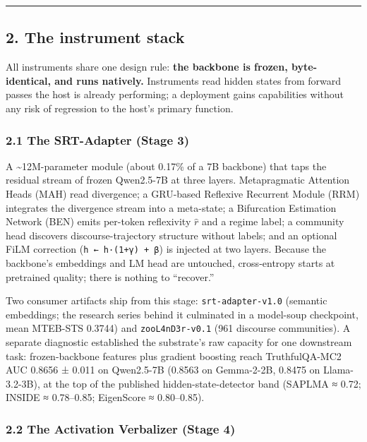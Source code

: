 \documentclass[
  11pt,
]{article}
\begin{document}
\begin{center}\rule{0.5\linewidth}{0.5pt}\end{center}

\subsection{2. The instrument stack}\label{the-instrument-stack}

All instruments share one design rule: \textbf{the backbone is frozen,
byte-identical, and runs natively.} Instruments read hidden states from
forward passes the host is already performing; a deployment gains
capabilities without any risk of regression to the host's primary
function.

\subsubsection{2.1 The SRT-Adapter (Stage
3)}\label{the-srt-adapter-stage-3}

A \textasciitilde12M-parameter module (about 0.17\% of a 7B backbone)
that taps the residual stream of frozen Qwen2.5-7B at three layers.
Metapragmatic Attention Heads (MAH) read divergence; a GRU-based
Reflexive Recurrent Module (RRM) integrates the divergence stream into a
meta-state; a Bifurcation Estimation Network (BEN) emits per-token
reflexivity \(\hat{r}\) and a regime label; a community head discovers
discourse-trajectory structure without labels; and an optional FiLM
correction (\texttt{h\ ←\ h·(1+γ)\ +\ β}) is injected at two layers.
Because the backbone's embeddings and LM head are untouched,
cross-entropy starts at pretrained quality; there is nothing to
``recover.''

Two consumer artifacts ship from this stage: \texttt{srt-adapter-v1.0}
(semantic embeddings; the research series behind it culminated in a
model-soup checkpoint, mean MTEB-STS 0.3744) and \texttt{zooL4nD3r-v0.1}
(961 discourse communities). A separate diagnostic established the
substrate's raw capacity for one downstream task: frozen-backbone
features plus gradient boosting reach TruthfulQA-MC2 AUC 0.8656 ± 0.011
on Qwen2.5-7B (0.8563 on Gemma-2-2B, 0.8475 on Llama-3.2-3B), at the top
of the published hidden-state-detector band (SAPLMA ≈ 0.72; INSIDE ≈
0.78--0.85; EigenScore ≈ 0.80--0.85).

\subsubsection{2.2 The Activation Verbalizer (Stage
4)}\label{the-activation-verbalizer-stage-4}
\end{document}
